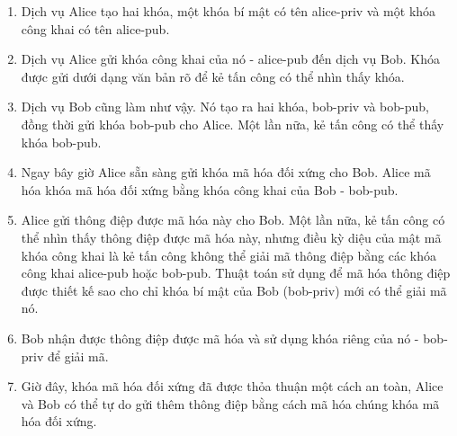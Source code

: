\documentclass[14pt,a4paper]{report}
\begin{document}
{	\hspace{0.3cm}{Miễn là những kẻ tấn công trung gian không biết khóa mã hóa, chúng không thể giải mã tin nhắn. Loại mã hóa này được gọi là mã hóa đối xứng vì cả hai bên đều biết khóa mã hóa.\\}
	
	\hspace{0.3cm}{Nhưng làm thế nào để khóa mã hóa đối xứng được thỏa thuận mà không có kẻ tấn công chặn nó? Đây là lúc mật mã khóa công khai phát huy tác dụng.\\}
	
	\hspace{0.3cm}{Mật mã khóa công khai là một phương pháp mã hóa sử dụng các cặp khóa: khóa bí mật và khóa công khai. Các khóa được liên kết về mặt toán học sao cho các thông báo được mã hóa bằng khóa công khai chỉ có thể được giải mã bằng khóa bí mật. Mật mã khóa công khai cho phép cả hai dịch vụ đồng ý với khóa mã hóa đối xứng mà khóa đó không được gửi qua mạng, nơi khóa có thể bị đánh cắp.\\}
	
	\hspace{0.3cm}{Hãy xem qua một ví dụ sử dụng hai dịch vụ tưởng tượng, Alice và Bob, muốn đồng ý về một khóa mã hóa đối xứng:}
	
	\begin{enumerate}
	\item Dịch vụ Alice tạo hai khóa, một khóa bí mật có tên alice-priv và một khóa công khai có tên alice-pub.
	\item Dịch vụ Alice gửi khóa công khai của nó - alice-pub đến dịch vụ Bob. Khóa được gửi dưới dạng văn bản rõ để kẻ tấn công có thể nhìn thấy khóa.
	\item Dịch vụ Bob cũng làm như vậy. Nó tạo ra hai khóa, bob-priv và bob-pub, đồng thời gửi khóa bob-pub cho Alice. Một lần nữa, kẻ tấn công có thể thấy khóa bob-pub.
	\item Ngay bây giờ Alice sẵn sàng gửi khóa mã hóa đối xứng cho Bob. Alice mã hóa khóa mã hóa đối xứng bằng khóa công khai của Bob - bob-pub.
	\item Alice gửi thông điệp được mã hóa này cho Bob. Một lần nữa, kẻ tấn công có thể nhìn thấy thông điệp được mã hóa này, nhưng điều kỳ diệu của mật mã khóa công khai là kẻ tấn công không thể giải mã thông điệp bằng các khóa công khai alice-pub hoặc bob-pub. Thuật toán sử dụng để mã hóa thông điệp được thiết kế sao cho chỉ khóa bí mật của Bob (bob-priv) mới có thể giải mã nó.
	\item Bob nhận được thông điệp được mã hóa và sử dụng khóa riêng của nó - bob-priv để giải mã.
	\item Giờ đây, khóa mã hóa đối xứng đã được thỏa thuận một cách an toàn, Alice và Bob có thể tự do gửi thêm thông điệp bằng cách mã hóa chúng khóa mã hóa đối xứng.
	\end{enumerate}

}
\end{document}

